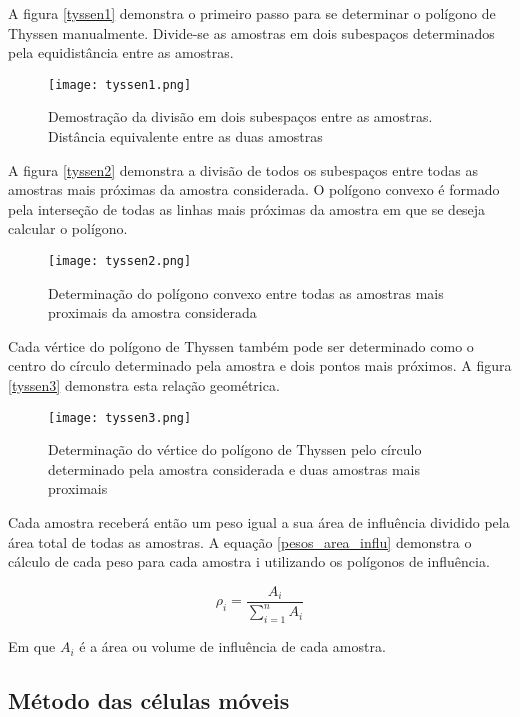  A figura \eqref{tyssen1} demonstra o primeiro passo para se determinar o polígono de Thyssen manualmente. Divide-se as amostras em dois subespaços determinados pela equidistância entre as amostras.
 
\begin{figure}[H]
 	\centering
 	\texttt{[image: tyssen1.png]}	
 	\caption{Demostração da divisão em dois subespaços entre as amostras. Distância equivalente entre as duas amostras }
 	\label{tyssen1}
\end{figure}

A figura \eqref{tyssen2} demonstra a divisão de todos os subespaços entre todas as amostras mais próximas da amostra considerada. O polígono convexo é formado pela interseção de todas as linhas mais próximas da amostra em que se deseja calcular o polígono. 

\begin{figure}[H]
  	\centering
  	\texttt{[image: tyssen2.png]}	
  	\caption{Determinação do polígono convexo entre todas as amostras mais proximais da amostra considerada}
  	\label{tyssen2}
\end{figure}
 
 Cada vértice do polígono de Thyssen também pode ser determinado como o centro do círculo determinado pela amostra e dois pontos mais próximos. A figura \eqref{tyssen3} demonstra esta relação geométrica. 
 
 \begin{figure}[H]
 	\centering
 	\texttt{[image: tyssen3.png]}	
 	\caption{Determinação do vértice do polígono de Thyssen pelo círculo determinado pela amostra considerada e duas amostras mais proximais}
 	\label{tyssen3}
 \end{figure}
 
 Cada amostra receberá então um peso igual a sua área de influência dividido pela área total de todas as amostras. A equação \eqref{pesos_area_influ} demonstra o cálculo de cada peso para cada amostra i utilizando os polígonos de influência.
 
  \begin{equation}\label{pesos_area_influ}
  \rho _{i} = \frac{A_{i}}{\sum_{i=1}^{n}A_{i}}
  \end{equation}
  
  Em que $A_{i}$ é a área ou volume de influência de cada amostra.
 
  \subsection{Método das células móveis }
  
